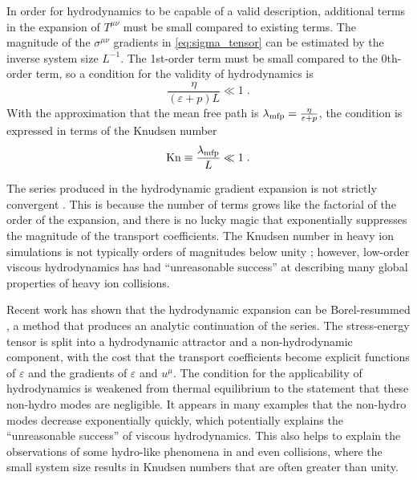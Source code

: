 

In order for hydrodynamics to be capable of a valid description, additional terms in the expansion of $T^{\mu\nu}$ must be small compared to existing terms.
The magnitude of the $\sigma^{\mu\nu}$ gradients in \cref{eq:sigma_tensor} can be estimated by the inverse system size $L^{-1}$.
The 1st-order term must be small compared to the 0th-order term, so a condition for the validity of hydrodynamics is \cite{Romatschke:2017ejr} %
\begin{equation}
  \frac{\eta}{(\varepsilon + p)L} \ll 1 \;.
\end{equation}
With the approximation that the mean free path is \(\lambda_\textrm{mfp} = \frac{\eta}{\varepsilon + p} \), the condition is expressed in terms of the Knudsen number
\begin{equation}
  \mathrm{Kn} \equiv \frac{\lambda_\textrm{mfp}}{L} \ll 1 \;.
\end{equation}

The series produced in the hydrodynamic gradient expansion is not strictly convergent \cite{Denicol:2016bjh}.
This is because the number of terms grows like the factorial of the order of the expansion, and there is no lucky magic that exponentially suppresses the magnitude of the transport coefficients.
The Knudsen number in heavy ion simulations is not typically orders of magnitudes below unity \cite{Niemi:2014wta}; however, low-order viscous hydrodynamics has had ``unreasonable success'' at describing many global properties of heavy ion collisions.

Recent work has shown that the hydrodynamic expansion can be Borel-resummed \cite{Romatschke:2016hle,Romatschke:2017vte}, a method that produces an analytic continuation of the series.
The stress-energy tensor is split into a hydrodynamic attractor and a non-hydrodynamic component, with the cost that the transport coefficients become explicit functions of $\varepsilon$ and the gradients of $\varepsilon$ and $u^\mu$.
The condition for the applicability of hydrodynamics is weakened from thermal equilibrium to the statement that these non-hydro modes are negligible.
It appears in many examples that the non-hydro modes decrease exponentially quickly, which potentially explains the ``unreasonable success'' of viscous hydrodynamics.
This also helps to explain the observations of some hydro-like phenomena in \pPb and even \pp collisions, where the small system size results in Knudsen numbers that are often greater than unity.


